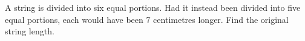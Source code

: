 A string is divided into six equal portions. Had it instead been divided into five equal portions, each would have been $7$ centimetres longer. Find the original string length.
